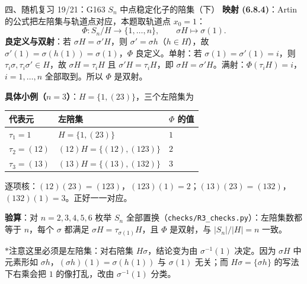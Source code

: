 \documentclass[aspectratio=169,10pt,fontset=none]{ctexbeamer}
\newcommand{\key}[1]{\textcolor{ink}{\bfseries #1}}
\newcommand{\starpt}{\textcolor{accent}{\bfseries$\ast$}}
\begin{document}
\begin{frame}[t]{四、随机复习 19/21：G163 $S_n$ 中点稳定化子的陪集（下）}
\scriptsize
\key{映射 (6.8.4)}：Artin 的公式把左陪集与轨道点对应，本题取轨道点 $x_0=1$：
\[ \Phi:S_n/H\longrightarrow\{1,\dots,n\},\qquad \sigma H\longmapsto \sigma(1). \]
\key{良定义与双射}：若 $\sigma H=\sigma'H$，则 $\sigma'=\sigma h$（$h\in H$），故 $\sigma'(1)=\sigma(h(1))=\sigma(1)$，$\Phi$ 良定义。单射：若 $\sigma(1)=\sigma'(1)=i$，则 $\tau_i\sigma,\tau_i\sigma'\in H$，故 $\sigma H=\tau_iH$ 且 $\sigma'H=\tau_iH$，即 $\sigma H=\sigma'H$。满射：$\Phi(\tau_iH)=i$，$i=1,\dots,n$ 全部取到。所以 $\Phi$ 是双射。

\key{具体小例（$n=3$）}：$H=\{1,(23)\}$，三个左陪集为
\begin{center}
{\scriptsize
\begin{tabular}{@{}lll@{}}
\toprule
代表元 & 左陪集 & $\Phi$ 的值\\
\midrule
$\tau_1=1$ & $H=\{1,(23)\}$ & $1$\\
$\tau_2=(12)$ & $(12)H=\{(12),(123)\}$ & $2$\\
$\tau_3=(13)$ & $(13)H=\{(13),(132)\}$ & $3$\\
\bottomrule
\end{tabular}}
\end{center}
逐项核：$(12)(23)=(123)$，$(123)(1)=2$；$(13)(23)=(132)$，$(132)(1)=3$。正好一一对应。

\key{验算}：对 $n=2,3,4,5,6$ 枚举 $S_n$ 全部置换（\texttt{checks/R3\_checks.py}）：左陪集数都等于 $n$，每个 $\sigma$ 都满足 $\sigma H=\tau_{\sigma(1)}H$，且 $\Phi$ 是双射，与 $|S_n|/|H|=n$ 一致。

\starpt{}注意这里必须是左陪集：对右陪集 $H\sigma$，结论变为由 $\sigma^{-1}(1)$ 决定。因为 $\sigma H$ 中元素形如 $\sigma h$，$(\sigma h)(1)=\sigma(h(1))$ 与 $\sigma(1)$ 无关；而 $H\sigma=\{\sigma h\}$ 的写法下右乘会把 $1$ 的像打乱，改由 $\sigma^{-1}(1)$ 分类。
\end{frame}
\end{document}
